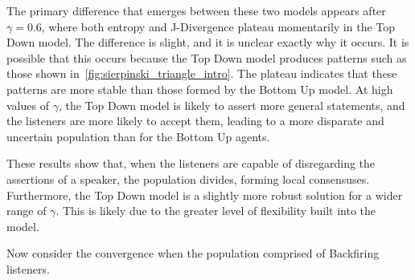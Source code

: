The primary difference that emerges between these two models appears after $\gamma = 0.6$, where both entropy and J-Divergence plateau momentarily in the Top Down model. The difference is slight, and it is unclear exactly why it occurs. It is possible that this occurs because the Top Down model produces patterns such as those shown in~\cref{fig:sierpinski_triangle_intro}. The plateau indicates that these patterns are more stable than those formed by the Bottom Up model. At high values of $\gamma$, the Top Down model is likely to assert more general statements, and the listeners are more likely to accept them, leading to a more disparate and uncertain population than for the Bottom Up agents.

These results show that, when the listeners are capable of disregarding the assertions of a speaker, the population divides, forming local consensuses. Furthermore, the Top Down model is a slightly more robust solution for a wider range of $\gamma$. This is likely due to the greater level of flexibility built into the model. 



Now consider the convergence when the population comprised of Backfiring listeners. 


